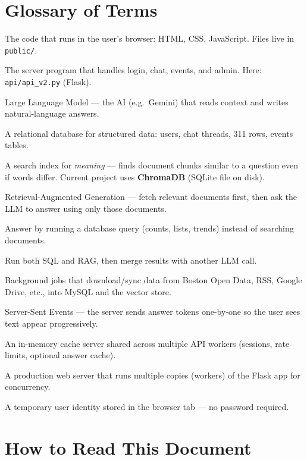 \documentclass[11pt,a4paper]{article}
\begin{document}
\section{Glossary of Terms}

\begin{description}[style=nextline, leftmargin=2.5cm]
  \item[Frontend] The code that runs in the user's browser: HTML, CSS, JavaScript. Files live in \texttt{public/}.
  \item[Backend / API] The server program that handles login, chat, events, and admin. Here: \texttt{api/api\_v2.py} (Flask).
  \item[LLM] Large Language Model --- the AI (e.g.\ Gemini) that reads context and writes natural-language answers.
  \item[MySQL] A relational database for structured data: users, chat threads, 311 rows, events tables.
  \item[Vector database] A search index for \emph{meaning} --- finds document chunks similar to a question even if words differ. Current project uses \textbf{ChromaDB} (SQLite file on disk).
  \item[RAG] Retrieval-Augmented Generation --- fetch relevant documents first, then ask the LLM to answer using only those documents.
  \item[SQL path] Answer by running a database query (counts, lists, trends) instead of searching documents.
  \item[Hybrid] Run both SQL and RAG, then merge results with another LLM call.
  \item[Ingestion] Background jobs that download/sync data from Boston Open Data, RSS, Google Drive, etc., into MySQL and the vector store.
  \item[SSE / Streaming] Server-Sent Events --- the server sends answer tokens one-by-one so the user sees text appear progressively.
  \item[Redis] An in-memory cache server shared across multiple API workers (sessions, rate limits, optional answer cache).
  \item[Gunicorn] A production web server that runs multiple copies (workers) of the Flask app for concurrency.
  \item[Guest session] A temporary user identity stored in the browser tab --- no password required.
\end{description}

\section{How to Read This Document}
\end{document}
